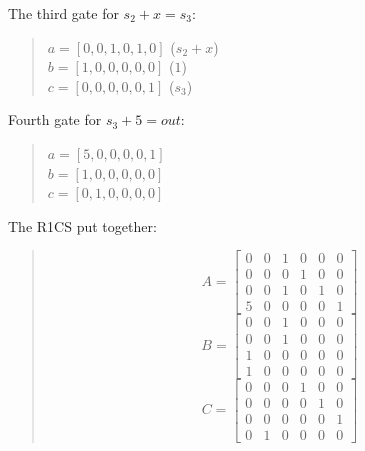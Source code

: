 The third gate for $s_2+x=s_3$:
\begin{quote}
   $a = [0,0,1,0,1,0]$ ($s_2+x$)
   \\
   $b = [1,0,0,0,0,0]$ ($1$)
   \\
   $c = [0,0,0,0,0,1]$ ($s_3$)
\end{quote}

Fourth gate for $s_3+5=out$:
\begin{quote}
   $a = [5,0,0,0,0,1]$
   \\
   $b = [1,0,0,0,0,0]$
   \\
   $c = [0,1,0,0,0,0]$
\end{quote}

The R1CS put together:
\begin{quote}
   \[
   A =
   \begin{bmatrix}
      0 & 0 & 1 & 0 & 0 & 0 \\
      0 & 0 & 0 & 1 & 0 & 0 \\
      0 & 0 & 1 & 0 & 1 & 0 \\
      5 & 0 & 0 & 0 & 0 & 1
   \end{bmatrix}
   \]
   \[
   B =
   \begin{bmatrix}
      0 & 0 & 1 & 0 & 0 & 0 \\
      0 & 0 & 1 & 0 & 0 & 0 \\
      1 & 0 & 0 & 0 & 0 & 0 \\
      1 & 0 & 0 & 0 & 0 & 0
   \end{bmatrix}
   \]
   \[
   C =
   \begin{bmatrix}
      0 & 0 & 0 & 1 & 0 & 0 \\
      0 & 0 & 0 & 0 & 1 & 0 \\
      0 & 0 & 0 & 0 & 0 & 1 \\
      0 & 1 & 0 & 0 & 0 & 0
   \end{bmatrix}
   \]
   \end{quote}
   
\cite{RC23}


